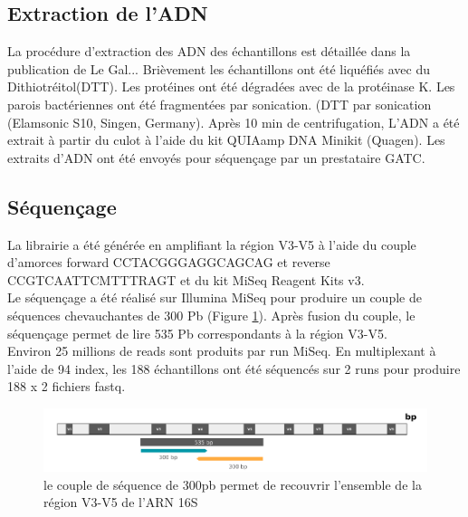 \documentclass[12pt,a4paper]{article}
\begin{document}
\subsection{Extraction de l’ADN}

La procédure d'extraction des ADN des échantillons est détaillée dans la publication de Le Gal... Brièvement les échantillons ont été liquéfiés avec du Dithiotréitol(DTT). Les protéines ont été dégradées avec de la protéinase K.
Les parois bactériennes ont été fragmentées par sonication. (DTT par sonication (Elamsonic S10, Singen, Germany). Après 10 min de centrifugation, L’ADN a été extrait à partir du culot à l'aide du kit QUIAamp DNA Minikit (Quagen).
Les extraits d’ADN ont été envoyés pour séquençage par un prestataire GATC.

\subsection{Séquençage}
La librairie a été générée en amplifiant la région V3-V5 à l’aide du couple d’amorces forward CCTACGGGAGGCAGCAG et reverse CCGTCAATTCMTTTRAGT et du kit MiSeq Reagent Kits v3. \\
Le séquençage a été réalisé sur Illumina MiSeq pour produire un couple de séquences chevauchantes de 300 Pb (Figure \ref{illumina}). Après fusion du couple, le séquençage permet de lire  535 Pb correspondants à la région V3-V5.\\
Environ 25 millions de reads sont produits par run MiSeq. En multiplexant à l’aide de 94 index, les 188 échantillons ont été séquencés sur 2 runs pour produire 188 x 2 fichiers fastq.

\begin{figure}[ht]
\begin{center}
\includegraphics[scale=0.6]{img/illumina.png}\hfill
\end{center}
\caption{le couple de séquence de 300pb permet de recouvrir l'ensemble de la région V3-V5 de l'ARN 16S}
\label{illumina}
\end{figure}
\end{document}
